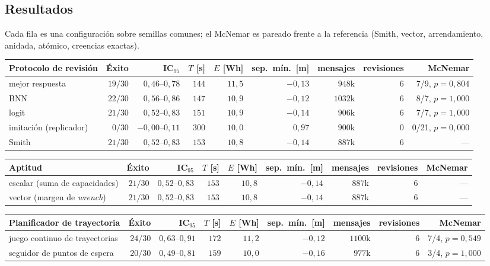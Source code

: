 \subsection{Resultados}

Cada fila es una configuración sobre semillas comunes; el McNemar es pareado frente a la referencia (Smith, vector, arrendamiento, anidada, atómico, creencias exactas).

\begin{center}\small
\begin{tabular}{@{}lrrrrrrrr@{}}
\toprule
Protocolo de revisión & Éxito & IC$_{95}$ & $T$ [s] & $E$ [Wh] & sep.\ mín.\ [m] & mensajes & revisiones & McNemar \\
\midrule
mejor respuesta & $19/30$ & $0{,}46$--$0{,}78$ & $144$ & $11{,}5$ & $-0{,}13$ & $948$k & $6$ & 7/9, $p=0{,}804$ \\
BNN & $22/30$ & $0{,}56$--$0{,}86$ & $147$ & $10{,}9$ & $-0{,}12$ & $1032$k & $6$ & 8/7, $p=1{,}000$ \\
logit & $21/30$ & $0{,}52$--$0{,}83$ & $151$ & $10{,}9$ & $-0{,}14$ & $906$k & $6$ & 7/7, $p=1{,}000$ \\
imitación (replicador) & $0/30$ & $-0{,}00$--$0{,}11$ & $300$ & $10{,}0$ & $0{,}97$ & $900$k & $0$ & 0/21, $p=0{,}000$ \\
Smith & $21/30$ & $0{,}52$--$0{,}83$ & $153$ & $10{,}8$ & $-0{,}14$ & $887$k & $6$ & — \\
\bottomrule
\end{tabular}
\end{center}

\begin{center}\small
\begin{tabular}{@{}lrrrrrrrr@{}}
\toprule
Aptitud & Éxito & IC$_{95}$ & $T$ [s] & $E$ [Wh] & sep.\ mín.\ [m] & mensajes & revisiones & McNemar \\
\midrule
escalar (suma de capacidades) & $21/30$ & $0{,}52$--$0{,}83$ & $153$ & $10{,}8$ & $-0{,}14$ & $887$k & $6$ & — \\
vector (margen de \emph{wrench}) & $21/30$ & $0{,}52$--$0{,}83$ & $153$ & $10{,}8$ & $-0{,}14$ & $887$k & $6$ & — \\
\bottomrule
\end{tabular}
\end{center}

\begin{center}\small
\begin{tabular}{@{}lrrrrrrrr@{}}
\toprule
Planificador de trayectoria & Éxito & IC$_{95}$ & $T$ [s] & $E$ [Wh] & sep.\ mín.\ [m] & mensajes & revisiones & McNemar \\
\midrule
juego continuo de trayectorias & $24/30$ & $0{,}63$--$0{,}91$ & $172$ & $11{,}2$ & $-0{,}12$ & $1100$k & $6$ & 7/4, $p=0{,}549$ \\
seguidor de puntos de espera & $20/30$ & $0{,}49$--$0{,}81$ & $159$ & $10{,}0$ & $-0{,}16$ & $977$k & $6$ & 3/4, $p=1{,}000$ \\
\bottomrule
\end{tabular}
\end{center}

